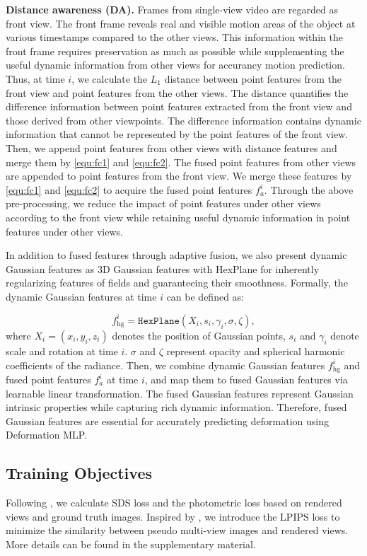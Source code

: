 \textbf{Distance awareness (DA).} Frames from single-view video are regarded as front view. The front frame reveals real and visible motion areas of the object at various timestamps compared to the other views. This information within the front frame requires preservation as much as possible while supplementing the useful dynamic information from other views for accurancy motion prediction. Thus, at time $i$, we calculate the $L_1$ distance between point features from the front view and point features from the other views. The distance quantifies the difference information between point features extracted from the front view and those derived from other viewpoints. The difference information contains dynamic information that cannot be represented by the point features of the front view. Then, we append point features from other views with distance features and merge them by \cref{equ:fc1} and \cref{equ:fc2}. The fused point features from other views are appended to point features from the front view. We merge these features by \cref{equ:fc1} and \cref{equ:fc2} to acquire the fused point features $f_a^i$. Through the above pre-processing, we reduce the impact of point features under other views according to the front view while retaining useful dynamic information in point features under other views.


In addition to fused features through adaptive fusion, we also present dynamic Gaussian features as 3D Gaussian features with HexPlane \cite{cao2023hexplane} for inherently regularizing features of fields and guaranteeing their smoothness. Formally, the dynamic Gaussian features at time $i$ can be defined as:

\begin{equation}
  \label{equ:sig1}
  f_{\text{hg}}^{i}=\mathtt{HexPlane}(X_i,s_i,\gamma_i,\sigma,\zeta), 
\end{equation} 
where $X_i=(x_i,y_i,z_i)$ denotes the position of Gaussian points, $s_i$ and $\gamma_i$ denote scale and rotation at time $i$. $\sigma$ and $\zeta$ represent opacity and spherical harmonic coefficients of the radiance. Then, we combine dynamic Gaussian features $f_{\text{hg}}^{i}$ and fused point features $f_a^i$ at time $i$, and map them to fused Gaussian features via learnable linear transformation. The fused Gaussian features represent Gaussian intrinsic properties while capturing rich dynamic information. Therefore, fused Gaussian features are essential for accurately predicting deformation using Deformation MLP.

\subsection{Training Objectives} Following \cite{zeng2024stag4d}, we calculate SDS loss and the photometric loss based on rendered views and ground truth images. Inspired by \cite{hong2023lrm,zou2024triplane,xu2024instantmesh}, we introduce the LPIPS loss to minimize the similarity between pseudo multi-view images and rendered views. More details can be found in the supplementary material.
 

